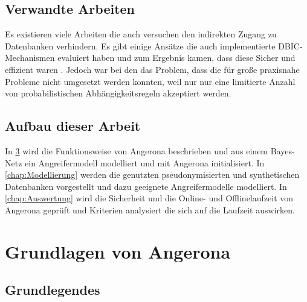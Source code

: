 \documentclass[german,version-2020-11]{uzl-thesis}
\begin{document}
\section{Verwandte Arbeiten}
Es existieren viele Arbeiten die auch versuchen den indirekten Zugang zu Datenbanken verhindern. Es gibt einige Ansätze die auch implementierte DBIC-Mechanismen evaluiert haben und zum Ergebnis kamen, dass diese Sicher und effizient waren \cite{24}. Jedoch war bei den das Problem, dass die für große praxisnahe Probleme nicht umgesetzt werden konnten, weil nur nur eine limitierte Anzahl von probabilistischen Abhängigkeitsregeln akzeptiert werden.


\section{Aufbau dieser Arbeit}
In \cref{chap:Grundlagen} wird die Funktionsweise von Angerona beschrieben und aus einem Bayes-Netz ein Angreifermodell modelliert und mit Angerona initialisiert. In \cref{chap:Modellierung} werden die genutzten pseudonymisierten und synthetischen Datenbanken vorgestellt und dazu geeignete Angreifermodelle modelliert. In \cref{chap:Auswertung} wird die Sicherheit und die Online- und Offlinelaufzeit von Angerona geprüft und Kriterien analysiert die sich auf die Laufzeit auswirken.

\chapter{Grundlagen von Angerona}\label{chap:Grundlagen}
\section{Grundlegendes}
\end{document}
